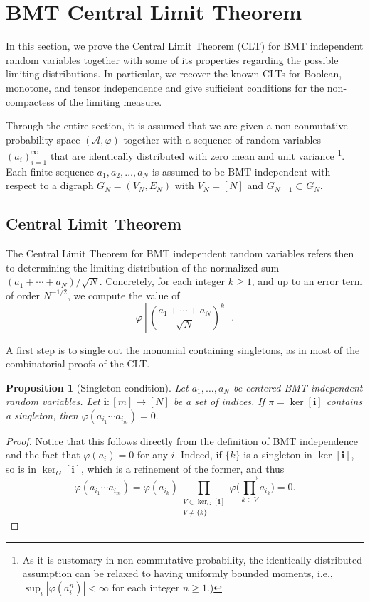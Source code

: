 \documentclass[a4paper,12pt]{extarticle}
\newtheorem{prop}[thm]{Proposition}
\theoremstyle{definition}
\theoremstyle{remark}
\begin{document}
\section{BMT Central Limit Theorem}
In this section, we prove the Central Limit Theorem (CLT) for BMT independent random variables  together with some of its properties regarding the possible limiting distributions. 
%
In particular, we recover the known CLTs for Boolean, monotone, and tensor independence and give sufficient conditions for the non-compactess of the limiting measure. 
%
%
%
%
%

Through the entire section, it is assumed that we are given a non-conmutative probability space $(\mathcal{A},\varphi)$ together with a sequence of random variables $(a_i)_{i=1}^\infty$ that are identically distributed with zero mean and unit variance
%
\footnote{As it is customary in non-commutative probability, the identically distributed assumption can be relaxed to having uniformly bounded moments, i.e., $\sup_{i} |\varphi(a_i^n)| < \infty$ for each integer $n\geq 1$.)}.
%
Each finite sequence $a_1, a_2, \ldots, a_N$ is assumed to be BMT independent with respect to a digraph $G_N = (V_N,E_N)$ with $V_N = [N]$ and $G_{N-1} \subset G_{N}$. 
%
%
%
%
%



\subsection{Central Limit Theorem}

The Central Limit Theorem for BMT independent random variables refers then to determining the limiting distribution of the normalized sum $(a_1+\cdots+a_N)/\sqrt{N}$. 
%
Concretely, for each integer $k \geq 1$, and up to an error term of order $N^{-1/2}$, we compute the value of 
%
\[ \varphi \left[ \left( \frac{a_1+\cdots+a_N}{\sqrt{N}}\right)^k \right] .\]
%
%
%
%


A first step is to single out the monomial containing singletons, as in most of the combinatorial proofs of the CLT.  

\begin{prop}[Singleton condition]\label{prop_singleton_cond} 
	Let $a_1,\ldots,a_N$ be centered BMT independent random variables. Let  $\bm{i}: [m] \to [N]$  be a set of indices. If $\pi = \ker[\bm{i}]$ contains a singleton, then 
$\varphi(a_{i_1}\cdots a_{i_m})=0.$
\end{prop}
\begin{proof}
Notice that this follows directly from the definition of BMT independence and the fact that $\varphi(a_i) = 0$ for any $i$. 
%
Indeed, if $\{k\}$ is a singleton in $\ker[\bm{i}]$, so is in $\ker_G[\bm{i}]$, which is a refinement of the former, and thus 
%
\[
\varphi(a_{i_1}\cdots a_{i_m})=	\varphi(a_{i_k})\prod_{\substack{V \in \ker_G[ \bm{i} ]\\V\neq\{k\} }} \varphi \bigg( \prod_{k \in V}^{\rightarrow} a_{i_k} \bigg)=0 .
\]
\end{proof}
\end{document}
